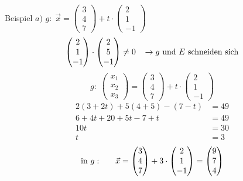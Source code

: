 \documentclass{article}
\begin{document}
\begin{boxx}[DarkBlue]{Beispiel}
    $a)$\hspace{3mm} $g:\; \vec{x} = \begin{pmatrix}3\\4\\7\end{pmatrix} + t\cdot \begin{pmatrix}2\\1\\-1\end{pmatrix}$
    \begin{align*}
        \begin{pmatrix}2\\1\\-1\end{pmatrix} \cdot \begin{pmatrix}2\\5\\-1\end{pmatrix} \not = 0 \hspace*{3mm} \rightarrow \text{$g$ und $E$ schneiden sich}
    \end{align*}
    \[g:\; \begin{pmatrix}x_1\\x_2\\x_3\end{pmatrix} = \begin{pmatrix}3\\4\\7\end{pmatrix} + t\cdot \begin{pmatrix}2\\1\\-1\end{pmatrix}\]
    \begin{align*}
        2(3+2t) + 5(4+5) - (7-t) &= 49 \\
        6 +4t + 20 +5t -7 +t &= 49 \\
        10 t &= 30 \\
        t &= 3
    \end{align*}
    \begin{align*}
        \text{in }g: \hspace*{6mm} \vec{x} = \begin{pmatrix}3\\4\\7\end{pmatrix} + 3 \cdot \begin{pmatrix}2\\1\\-1\end{pmatrix} = \begin{pmatrix}9\\7\\4\end{pmatrix}

\end{align*}
\end{boxx}
\end{document}
